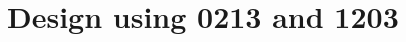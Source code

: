 
 \begin{center}




 \end{center}



\section{Design using 0213 and 1203}


 \begin{center}




 \end{center}



